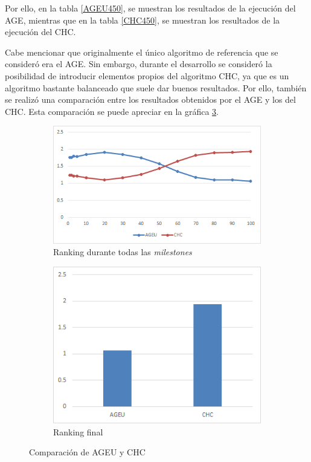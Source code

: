 Por ello, en la tabla \ref{AGEU450}, se muestran los resultados de la ejecución del AGE, mientras que en la tabla \ref{CHC450}, se muestran los resultados de la ejecución del CHC. 

Cabe mencionar que originalmente el único algoritmo de referencia que se consideró era el AGE. 
Sin embargo, durante el desarrollo se consideró la posibilidad de introducir elementos propios del algoritmo CHC, ya que es un algoritmo bastante balanceado que suele dar buenos resultados. 
Por ello, también se realizó una comparación entre los resultados obtenidos por el AGE y los del CHC. 
Esta comparación se puede apreciar en la gráfica \ref{fig:AGEUvsCHC}.

\begin{figure}
     \centering
     \begin{subfigure}[b]{0.45\textwidth}
         \centering
         \includegraphics[width=\textwidth]{imagenes/Experimental/AGEUvsCHC.png}
         \caption{Ranking durante todas las \textit{milestones}}
         \label{fig:AGEUvsCHC_lineas}
     \end{subfigure}
     \hfill
     \begin{subfigure}[b]{0.45\textwidth}
         \centering
         \includegraphics[width=\textwidth]{imagenes/Experimental/barras/AGEUvsCHC.png}
         \caption{Ranking final}
         \label{fig:AGEUvsCHC_barras}
     \end{subfigure}
        \caption{Comparación de AGEU y CHC}
        \label{fig:AGEUvsCHC}
\end{figure}


